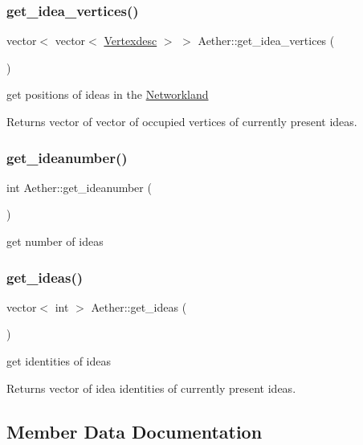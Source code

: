 \subsubsection{\texorpdfstring{get\+\_\+idea\+\_\+vertices()}{get\_idea\_vertices()}}
{\footnotesize\ttfamily vector$<$ vector$<$ \hyperlink{Networkland_8h_af340ced64bd0b6914662d1b26be70b41}{Vertexdesc} $>$ $>$ Aether\+::get\+\_\+idea\+\_\+vertices (\begin{DoxyParamCaption}{ }\end{DoxyParamCaption})}



get positions of ideas in the \hyperlink{classNetworkland}{Networkland} 

Returns vector of vector of occupied vertices of currently present ideas. \mbox{\label{classAether_a7c03f99d5a7ae5b866b8fdabeab890aa}} 
\subsubsection{\texorpdfstring{get\+\_\+ideanumber()}{get\_ideanumber()}}
{\footnotesize\ttfamily int Aether\+::get\+\_\+ideanumber (\begin{DoxyParamCaption}{ }\end{DoxyParamCaption})}



get number of ideas 

\mbox{\label{classAether_a9ca2639bc95e00c78849775f578ea088}} 
\subsubsection{\texorpdfstring{get\+\_\+ideas()}{get\_ideas()}}
{\footnotesize\ttfamily vector$<$ int $>$ Aether\+::get\+\_\+ideas (\begin{DoxyParamCaption}{ }\end{DoxyParamCaption})}



get identities of ideas 

Returns vector of idea identities of currently present ideas. 

\subsection{Member Data Documentation}
\mbox{\label{classAether_ac58cc20fc4eddd732cfe22b2557060b1}} 
